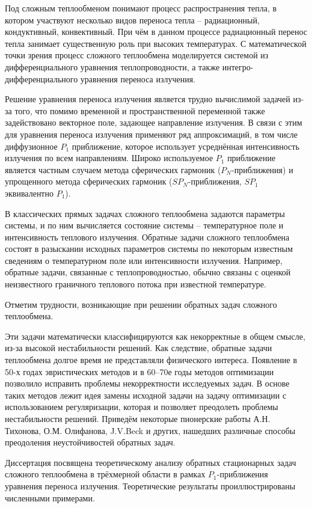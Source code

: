 {\actuality}
Под сложным теплообменом понимают процесс распространения тепла,
в котором участвуют несколько видов переноса тепла – радиационный, кондуктивный, конвективный.
При чём в данном процессе радиационный перенос тепла занимает существенную роль при высоких температурах.
С математической точки зрения процесс сложного теплообмена моделируется системой из
дифференциального уравнения теплопроводности, а также интегро-дифференциального уравнения переноса излучения.


Решение уравнения переноса излучения является трудно вычислимой задачей из-за того,
что помимо временной и пространственной переменной также задействовано
векторное поле, задающее направление излучения.
В связи с этим для уравнения переноса излучения применяют ряд аппроксимаций,
в том числе диффузионное $P_1$ приближение, которое использует
усреднённая интенсивность излучения по всем направлениям.
Широко используемое $P_1$ приближение является частным случаем метода сферических
гармоник ($P_N$-приближения) и упрощенного метода сферических гармоник
($SP_N$-приближения, $SP_1$ эквивалентно $P_1$).


В классических прямых задачах сложного теплообмена задаются параметры системы, и по ним вычисляется
состояние системы – температурное поле и интенсивность теплового излучения.
Обратные задачи сложного теплообмена состоят в разыскании исходных параметров системы по некоторым
известным сведениям о температурном поле или интенсивности излучения.
Например, обратные задачи, связанные с теплопроводностью, обычно связаны с
оценкой неизвестного граничного теплового потока при известной температуре.


Отметим трудности, возникающие при решении обратных задач сложного теплообмена.


Эти задачи математически классифицируются как некорректные в общем смысле, из-за высокой нестабильности решений.
Как следствие, обратные задачи теплообмена долгое время не представляли физического интереса.
Появление в 50-х годах эвристических методов и в 60–70е годы методов оптимизации
позволило исправить проблемы некорректности исследуемых задач.
В основе таких методов лежит идея замены исходной задачи на задачу оптимизации
с использованием регуляризации, которая и позволяет преодолеть проблемы нестабильности решений.
Приведём некоторые пионерские работы А.Н. Тихонова, О.М. Олифанова, J.V.Beck и других, нашедших различные способы
преодоления неустойчивостей обратных задач.


Диссертация посвящена теоретическому анализу обратных стационарных
задач сложного теплообмена в трёхмерной области в рамках $P_1$-приближения
уравнения переноса излучения.
Теоретические результаты проиллюстрированы численными примерами.


